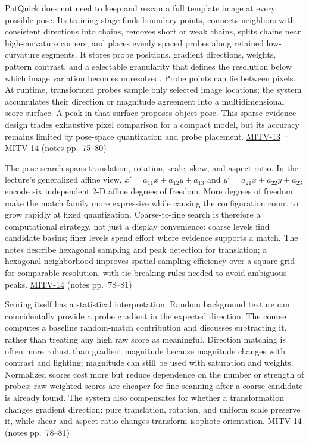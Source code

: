 PatQuick does not need to keep and rescan a full template image at every possible pose. Its training stage finds boundary points, connects neighbors with consistent directions into chains, removes short or weak chains, splits chains near high-curvature corners, and places evenly spaced probes along retained low-curvature segments. It stores probe positions, gradient directions, weights, pattern contrast, and a selectable granularity that defines the resolution below which image variation becomes unresolved. Probe points can lie between pixels. At runtime, transformed probes sample only selected image locations; the system accumulates their direction or magnitude agreement into a multidimensional score surface. A peak in that surface proposes object pose. This sparse evidence design trades exhaustive pixel comparison for a compact model, but its accuracy remains limited by pose-space quantization and probe placement. \hyperref[04-visual-computing-ii-ch036-mitv-13---object-detection-recognition-and-pose-determination-patquick-us-7016539]{MITV-13} · \hyperref[04-visual-computing-ii-ch036-mitv-14---inspection-in-patquick-hough-transform-homography-position-determination-multi-scale]{MITV-14} (notes pp.~75--80)

The pose search spans translation, rotation, scale, skew, and aspect ratio. In the lecture's generalized affine view, \(x'=a_{11}x+a_{12}y+a_{13}\) and \(y'=a_{21}x+a_{22}y+a_{23}\) encode six independent 2-D affine degrees of freedom. More degrees of freedom make the match family more expressive while causing the configuration count to grow rapidly at fixed quantization. Coarse-to-fine search is therefore a computational strategy, not just a display convenience: coarse levels find candidate basins; finer levels spend effort where evidence supports a match. The notes describe hexagonal sampling and peak detection for translation; a hexagonal neighborhood improves spatial sampling efficiency over a square grid for comparable resolution, with tie-breaking rules needed to avoid ambiguous peaks. \hyperref[04-visual-computing-ii-ch036-mitv-14---inspection-in-patquick-hough-transform-homography-position-determination-multi-scale]{MITV-14} (notes pp.~78--81)

Scoring itself has a statistical interpretation. Random background texture can coincidentally provide a probe gradient in the expected direction. The course computes a baseline random-match contribution and discusses subtracting it, rather than treating any high raw score as meaningful. Direction matching is often more robust than gradient magnitude because magnitude changes with contrast and lighting; magnitude can still be used with saturation and weights. Normalized scores cost more but reduce dependence on the number or strength of probes; raw weighted scores are cheaper for fine scanning after a coarse candidate is already found. The system also compensates for whether a transformation changes gradient direction: pure translation, rotation, and uniform scale preserve it, while shear and aspect-ratio changes transform isophote orientation. \hyperref[04-visual-computing-ii-ch036-mitv-14---inspection-in-patquick-hough-transform-homography-position-determination-multi-scale]{MITV-14} (notes pp.~78--81)

